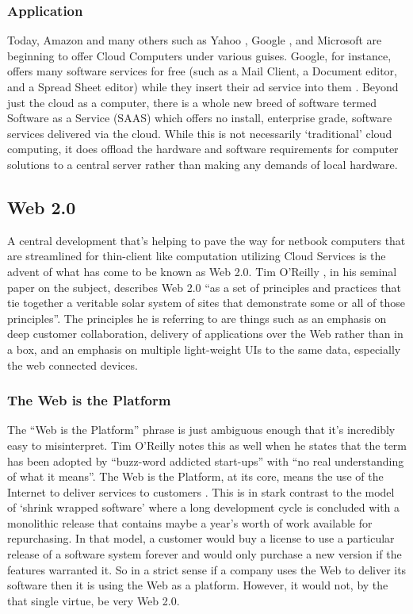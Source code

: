 \documentclass[12pt,oneside,letterpaper,titlepage]{article}
\begin{document}
\subsubsection{Application}

Today, Amazon \citep{reiss2008} and many others such as Yahoo \citep{yahoo2009},
Google \citep{baker2007}, and Microsoft \citep{reiss2008} are beginning to offer
Cloud Computers under various guises.  Google, for instance, offers many
software services for free (such as a Mail Client, a Document editor, and a
Spread Sheet editor) while they insert their ad service into them
\citep{mcdougall2007}.  Beyond just the cloud as a computer, there is a whole
new breed of software termed Software as a Service (SAAS) which offers no
install, enterprise grade, software services delivered via the cloud.  While
this is not necessarily `traditional' cloud computing, it does offload the
hardware and software requirements for computer solutions to a central server
rather than making any demands of local hardware.

\subsection{Web 2.0}

A central development that's helping to pave the way for netbook computers that
are streamlined for thin-client like computation utilizing Cloud Services is the
advent of what has come to be known as Web 2.0.  Tim O'Reilly
\citeyearpar{oreilly2007}, in his seminal paper on the subject, describes Web
2.0 ``as a set of principles and practices that tie together a veritable solar
system of sites that demonstrate some or all of those principles''. The
principles he is referring to are things such as an emphasis on deep customer
collaboration, delivery of applications over the Web rather than in a box, and
an emphasis on multiple light-weight UIs to the same data, especially the web
connected devices.

\subsubsection{The Web is the Platform}

The ``Web is the Platform'' phrase is just ambiguous enough that it's incredibly
easy to misinterpret.  Tim O'Reilly \citeyearpar{oreilly2007} notes this as well when
he states that the term has been adopted by ``buzz-word addicted start-ups''
with ``no real understanding of what it means''.  The Web is the Platform, at
its core, means the use of the Internet to deliver services to customers
\citep{miller2005}.  This is in stark contrast to the model of `shrink wrapped
software' where a long development cycle is concluded with a monolithic release
that contains maybe a year's worth of work available for repurchasing.  In that
model, a customer would buy a license to use a particular release of a software
system forever and would only purchase a new version if the features warranted
it.  So in a strict sense if a company uses the Web to deliver its software then
it is using the Web as a platform.  However, it would not, by the that single
virtue, be very Web 2.0.
\end{document}
